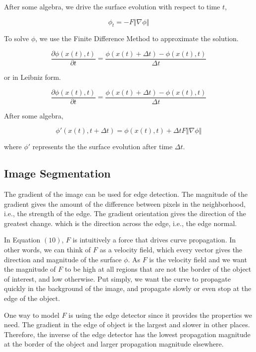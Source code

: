 \documentclass[12pt, letter]{article}
\begin{document}
After some algebra, we drive the surface evolution with respect to time $t$,

\begin{equation}
    \phi_t = -F \left\Vert \nabla \phi \right\Vert
\end{equation}

To solve $\phi$, we use the Finite Difference Method to approximate the solution.  

\begin{equation}
    \frac{\partial \phi(x(t), t)}{\partial t} = \frac{\phi(x(t) + \Delta t) - \phi(x(t), t)}{\Delta t}
\end{equation}

or in Leibniz form.

\begin{equation}
    \frac{\partial \phi(x(t), t)}{\partial t} = \frac{\phi(x(t) + \Delta t) - \phi(x(t), t)}{\Delta t}
\end{equation}

After some algebra,

\begin{equation}
    \phi ' (x(t), t + \Delta t) = \phi (x(t), t) + \Delta t F \left\Vert \nabla \phi \right\Vert
\end{equation}

where $\phi '$ represents the the surface evolution after time $\Delta t$.

\subsection{Image Segmentation}
The gradient of the image can be used for edge detection. The magnitude of the gradient gives the amount of the difference between pixels in the neighborhood, i.e., the strength of the edge. The gradient orientation gives the direction of the greatest change. which is the direction across the edge, i.e., the edge normal. 

In Equation $(10)$, $F$ is intuitively a force that drives curve propagation. In other words, we can think of $F$ as a velocity field, which every vector gives the direction and magnitude of the surface $\phi$. As $F$ is the velocity field and we want the magnitude of $F$ to be high at all regions that are not the border of the object of interest, and low otherwise. Put simply, we want the curve to propagate quickly in the background of the image, and propagate slowly or even stop at the edge of the object. 

One way to model $F$ is using the edge detector since it provides the properties we need. The gradient in the edge of object is the largest and slower in other places. Therefore, the inverse of the edge detector has the lowest propagation magnitude at the border of the object and larger propagation magnitude elsewhere. 
\end{document}
